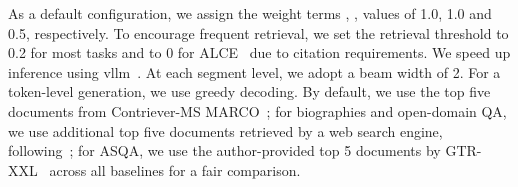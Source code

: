 As a default configuration, we assign the weight terms \crel, \cgr, \cuse values of 1.0, 1.0 and 0.5, respectively.
 To encourage frequent retrieval, we set the retrieval threshold to 0.2 for most tasks and to 0 for ALCE~\citep{gao2023enabling} due to citation requirements.    
We speed up inference using vllm~\citep{kwon2023efficient}. 
At each segment level, we adopt a beam width of 2.  
For a token-level generation, we use greedy decoding.  
By default, we use the top five documents from Contriever-MS MARCO~\citep{izacard2021towards}; for biographies and open-domain QA, we use additional top five documents retrieved by a web search engine, following~\cite{luo2023sail}; for ASQA, we use the author-provided top 5 documents by GTR-XXL~\citep{ni2021large} across all baselines for a fair comparison. 



